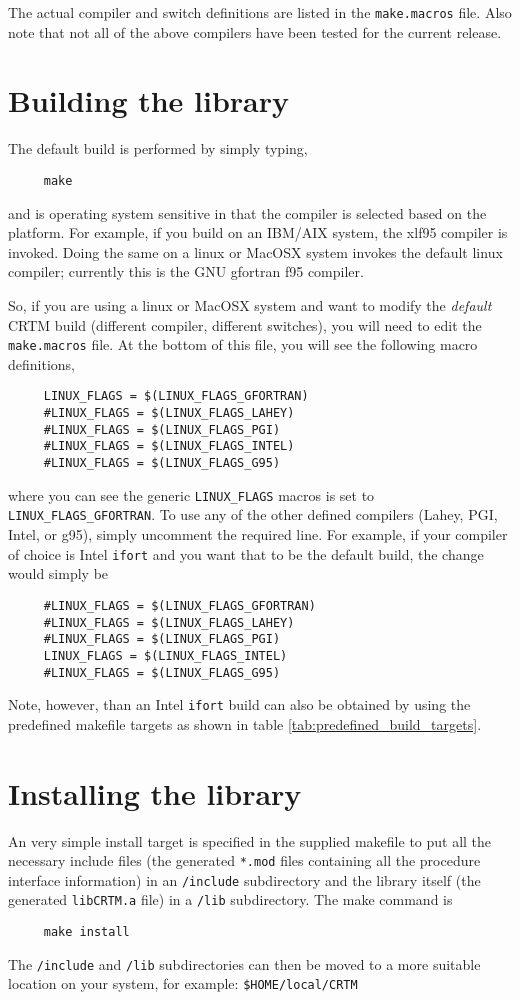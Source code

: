 The actual compiler and switch definitions are listed in the \texttt{make.macros} file. Also note that not all of the above compilers have been tested for the current release.

\section{Building the library}
The default build is performed by simply typing,

\begin{verbatim}     make\end{verbatim}

and is operating system sensitive in that the compiler is selected based on the platform. For example, if you build on an IBM/AIX system, the xlf95 compiler is invoked. Doing the same on a linux or MacOSX system invokes the default linux compiler; currently this is the GNU gfortran f95 compiler.

So, if you are using a linux or MacOSX system and want to modify the \emph{default} CRTM build (different compiler, different switches), you will need to edit the \texttt{make.macros} file. At the bottom of this file, you will see the following macro definitions,
\begin{verbatim}
     LINUX_FLAGS = $(LINUX_FLAGS_GFORTRAN)
     #LINUX_FLAGS = $(LINUX_FLAGS_LAHEY)
     #LINUX_FLAGS = $(LINUX_FLAGS_PGI)
     #LINUX_FLAGS = $(LINUX_FLAGS_INTEL)
     #LINUX_FLAGS = $(LINUX_FLAGS_G95)\end{verbatim}
where you can see the generic \texttt{LINUX\_FLAGS} macros is set to \texttt{LINUX\_FLAGS\_GFORTRAN}. To use any of the other defined compilers (Lahey, PGI, Intel, or g95), simply uncomment the required line. For example, if your compiler of choice is Intel \texttt{ifort} and you want that to be the default build, the change would simply be
\begin{verbatim}
     #LINUX_FLAGS = $(LINUX_FLAGS_GFORTRAN)
     #LINUX_FLAGS = $(LINUX_FLAGS_LAHEY)
     #LINUX_FLAGS = $(LINUX_FLAGS_PGI)
     LINUX_FLAGS = $(LINUX_FLAGS_INTEL)
     #LINUX_FLAGS = $(LINUX_FLAGS_G95)\end{verbatim}
Note, however, than an Intel \texttt{ifort} build can also be obtained by using the predefined makefile targets as shown in table \ref{tab:predefined_build_targets}.
     
     
\section{Installing the library}
An very simple install target is specified in the supplied makefile to put all the necessary include files (the generated \texttt{*.mod} files containing all the procedure interface information) in an \texttt{/include} subdirectory and the library itself (the generated \texttt{libCRTM.a} file) in a \texttt{/lib} subdirectory. The make command is
\begin{verbatim}     make install\end{verbatim}
The \texttt{/include} and \texttt{/lib} subdirectories can then be moved to a more suitable location on your system, for example: \texttt{\$HOME/local/CRTM}


